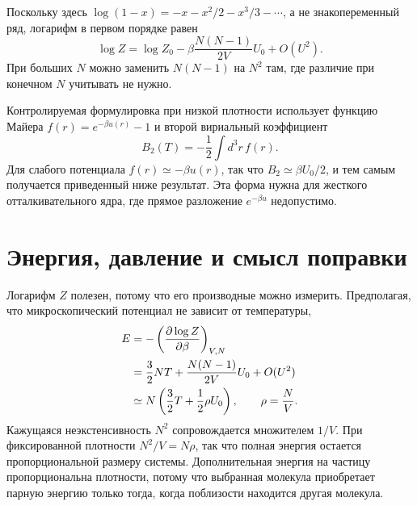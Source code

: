 \begin{classroomqa}
\end{classroomqa}

Поскольку здесь \(\log(1-x)=-x-x^2/2-x^3/3-\cdots\), а не знакопеременный ряд, логарифм в первом порядке равен
\begin{equation}
 \log Z
 =
 \log Z_0
 -\beta\frac{N(N-1)}{2V}U_0
 +O(U^2).
 \label{eq:sm6-logz-correction}
\end{equation}
При больших \(N\) можно заменить \(N(N-1)\) на \(N^2\) там, где различие при конечном \(N\) учитывать не нужно.

\begin{remark}
Контролируемая формулировка при низкой плотности использует функцию Майера \(f(r)=e^{-\beta u(r)}-1\) и второй вириальный коэффициент
\begin{equation}
 B_2(T)=-\frac{1}{2}\int d^3r\,f(r).
 \label{eq:sm6-second-virial}
\end{equation}
Для слабого потенциала \(f(r)\simeq-\beta u(r)\), так что
\(B_2\simeq\beta U_0/2\), и тем самым получается приведенный ниже результат. Эта форма нужна для жесткого отталкивательного ядра, где прямое разложение \(e^{-\beta u}\) недопустимо.
\end{remark}

\section{Энергия, давление и смысл поправки}

Логарифм \(Z\) полезен, потому что его производные можно измерить. Предполагая, что микроскопический потенциал не зависит от температуры,
\begin{align}
 E
 &=-\left(\frac{\partial\log Z}{\partial\beta}\right)_{V,N} \notag\\
 &=
 \frac{3}{2}NT
 +\frac{N(N-1)}{2V}U_0+O(U^2) \notag\\
 &\simeq
 N\left(\frac{3}{2}T+\frac{1}{2}\rho U_0\right),
 \qquad
 \rho=\frac{N}{V}.
 \label{eq:sm6-energy-correction}
\end{align}
Кажущаяся неэкстенсивность \(N^2\) сопровождается множителем \(1/V\). При фиксированной плотности \(N^2/V=N\rho\), так что полная энергия остается пропорциональной размеру системы. Дополнительная энергия на частицу пропорциональна плотности, потому что выбранная молекула приобретает парную энергию только тогда, когда поблизости находится другая молекула.

